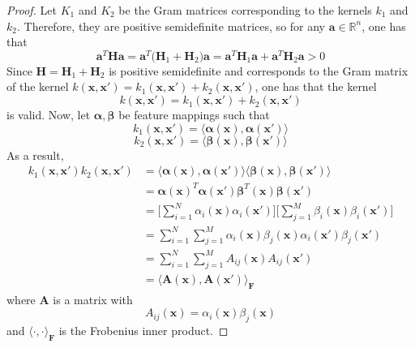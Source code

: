 \begin{proof}
    Let $K_1$ and $K_2$ be the Gram matrices corresponding to the 
    kernels $k_1$ and $k_2$. Therefore, they are positive semidefinite matrices, so
    for any $\mathbf{a} \in \mathbb{R}^n$, one has that
    \[
        \mathbf{a}^T\mathbf{H}\mathbf{a}
        = \mathbf{a}^T\big(\mathbf{H}_1 + \mathbf{H}_2\big)\mathbf{a}
        = \mathbf{a}^T \mathbf{H}_1 \mathbf{a} + \mathbf{a}^T \mathbf{H}_2 \mathbf{a} > 0
    \] 
    Since $\mathbf{H} = \mathbf{H}_1 + \mathbf{H}_2$ is positive semidefinite
    and corresponds to the Gram matrix of the 
    kernel $k(\mathbf{x}, \mathbf{x}') = k_1(\mathbf{x}, \mathbf{x'}) + 
    k_2(\mathbf{x}, \mathbf{x}')$, one has that the kernel
    \begin{equation*}
        k(\mathbf{x}, \mathbf{x}') = k_1(\mathbf{x}, \mathbf{x}') + k_2(\mathbf{x}, \mathbf{x}')
        \tag{6.17}\label{eq:6.17}
    \end{equation*}
    is valid. Now, let $\bm{\alpha}, \bm{\beta}$ be feature mappings such that
    \[
        k_1(\mathbf{x}, \mathbf{x}') 
        = \langle \bm{\alpha}(\mathbf{x}), \bm{\alpha}(\mathbf{x}') \rangle 
    \] 
    \[
        k_2(\mathbf{x}, \mathbf{x}') 
        = \langle \bm{\beta}(\mathbf{x}), \bm{\beta}(\mathbf{x}') \rangle 
    \]
    As a result,
    \begin{align*}
        k_1(\mathbf{x}, \mathbf{x}') k_2(\mathbf{x}, \mathbf{x}')
        &= \langle \bm{\alpha}(\mathbf{x}), \bm{\alpha}(\mathbf{x}') \rangle 
        \langle \bm{\beta}(\mathbf{x}), \bm{\beta}(\mathbf{x}') \rangle \\
        &= \bm{\alpha}(\mathbf{x})^T \bm{\alpha}(\mathbf{x}')
        \bm{\beta}^T(\mathbf{x}) \bm{\beta}(\mathbf{x}') \\
        &= \bigg[\sum_{i=1}^{N} \alpha_i(\mathbf{x}) \alpha_i(\mathbf{x}')\bigg]
        \bigg[\sum_{j=1}^{M} \beta_i(\mathbf{x}) \beta_i(\mathbf{x}')\bigg] \\
        &= \sum_{i=1}^{N} \sum_{j=1}^{M} \alpha_i(\mathbf{x}) \beta_j(\mathbf{x})
        \alpha_i(\mathbf{x}') \beta_j(\mathbf{x}') \tag{*}\\
        &= \sum_{i=1}^{N} \sum_{j=1}^{M}  A_{ij}(\mathbf{x}) A_{ij}(\mathbf{x}') \\
        &= \langle \mathbf{A}(\mathbf{x}), \mathbf{A}(\mathbf{x'}) \rangle_\mathbf{F}
    \end{align*}
    where $\mathbf{A}$ is a matrix with
    \[
        A_{ij}(\mathbf{x}) = \alpha_i(\mathbf{x}) \beta_j(\mathbf{x})
    \] 
    and $\langle \cdot, \cdot \rangle_\mathbf{F}$ is the Frobenius inner product.

\end{proof}
